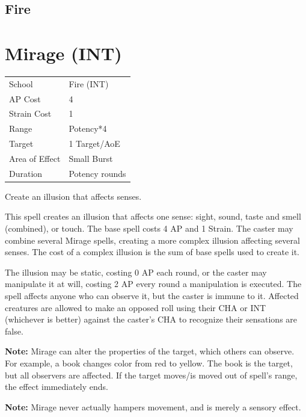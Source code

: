 \documentclass[11pt,a4paper,twocolumn]{book}
\begin{document}
	
	\subsection*{Fire}
	
		\section*{Mirage (INT)}
	{
		\begin{tabu} to 75mm{| X[l,4] | X[l,7] |}
			\hline
			School 			&  Fire (INT)			\\
			AP Cost	      	&  4					\\
			Strain Cost     &  1					\\
			Range     		&  Potency*4			\\
			Target      	&  1 Target/AoE			\\
			Area of Effect  &  Small Burst	 		\\
			Duration     	&  Potency rounds		\\ \hline
		\end{tabu}
		
	}
	
	\medskip
	
	Create an illusion that affects senses.
	
	This spell creates an illusion that affects one sense: sight, sound, taste and smell (combined), or touch. The base spell costs 4 AP and 1 Strain. The caster may combine several Mirage spells, creating a more complex illusion affecting several senses. The cost of a complex illusion is the sum of base spells used to create it.
	
	The illusion may be static, costing 0 AP each round, or the caster may manipulate it at will, costing 2 AP every round a manipulation is executed. The spell affects anyone who can observe it, but the caster is immune to it. Affected creatures are allowed to make an opposed roll using their CHA or INT (whichever is better) against the caster's CHA to recognize their sensations are false.
	
	\textbf{Note:} Mirage can alter the properties of the target, which others can observe. For example, a book changes color from red to yellow. The book is the target, but all observers are affected. If the target moves/is moved out of spell's range, the effect immediately ends.
	
	\textbf{Note:} Mirage never actually hampers movement, and is merely a sensory effect.
	
\end{document}
